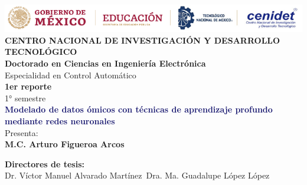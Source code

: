 \begin{titlepage}
    \begin{center}
        \noindent \includegraphics[width=\textwidth]{logos latex.PNG} \\[2cm] %
        \textbf{{\Huge CENTRO NACIONAL DE INVESTIGACIÓN Y DESARROLLO TECNOLÓGICO}}\\[1cm]
        
        \textbf{\Large{Doctorado en Ciencias en Ingeniería Electrónica}}\\
        {\large Especialidad en Control Automático}\\[1cm]
        
        \textbf{{\Large 1er reporte}}\\
        {\large 1° semestre}\\[1cm]
              
        \textbf{\Large{\textcolor{MidnightBlue}{Modelado de datos ómicos con técnicas de aprendizaje profundo mediante redes neuronales}}}\\[1cm]
        
        {\large Presenta:}\\
        \textbf{{\Large M.C. Arturo Figueroa Arcos}}\\[1cm]
    
    \end{center}
    
    \begin{minipage}{0.46\textwidth}										
        \begin{flushleft}														
                \begin{center}
    
            \textbf{Directores de tesis:}\\
         
            Dr. Víctor Manuel Alvarado Martínez\
            Dra. Ma. Guadalupe López López\\
            
                \end{center}
        \end{flushleft}
    \end{minipage}		
    \begin{minipage}{0.52\textwidth}		
    \vspace{0cm}
        \begin{flushright}															%
                \begin{center}
    

\end{center}
\end{flushright}
\end{minipage}
\end{titlepage}
